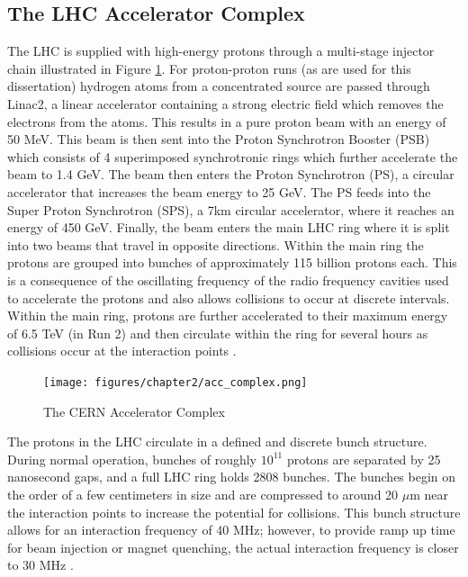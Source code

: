\subsection{The LHC Accelerator Complex}\label{sec:acc_comp}
The LHC is supplied with high-energy protons through a multi-stage injector chain illustrated in Figure \ref{fig:acc_comp}. For proton-proton runs (as are used for this dissertation) hydrogen atoms from a concentrated source are passed through Linac2, a linear accelerator containing a strong electric field which removes the electrons from the atoms. This results in a pure proton beam with an energy of 50 MeV. This beam is then sent into the Proton Synchrotron Booster (PSB) which consists of 4 superimposed synchrotronic rings which further accelerate the beam to 1.4 GeV. The beam then enters the Proton Synchrotron (PS), a circular accelerator that increases the beam energy to 25 GeV. The PS feeds into the Super Proton Synchrotron (SPS), a 7km circular accelerator, where it reaches an energy of 450 GeV. Finally, the beam enters the main LHC ring where it is split into two beams that travel in opposite directions. Within the main ring the protons are grouped into bunches of approximately 115 billion protons each. This is a consequence of the oscillating frequency of the radio frequency cavities used to accelerate the protons and also allows collisions to occur at discrete intervals. Within the main ring, protons are further accelerated to their maximum energy of 6.5 TeV (in Run 2) and then circulate within the ring for several hours as collisions occur at the interaction points \cite{lhc_guide}.\\

\begin{figure}[h]
    \centering
    \texttt{[image: figures/chapter2/acc\_complex.png]}
    \caption{The CERN Accelerator Complex}
    \label{fig:acc_comp}
\end{figure}

The protons in the LHC circulate in a defined and discrete bunch structure. During normal operation, bunches of roughly $10^{11}$ protons are separated by 25 nanosecond gaps, and a full LHC ring holds 2808 bunches. The bunches begin on the order of a few centimeters in size and are compressed to around 20 $\mu$m near the interaction points to increase the potential for collisions. This bunch structure allows for an interaction frequency of 40 MHz; however, to provide ramp up time for beam injection or magnet quenching, the actual interaction frequency is closer to 30 MHz \cite{lhc_machine}.\\


